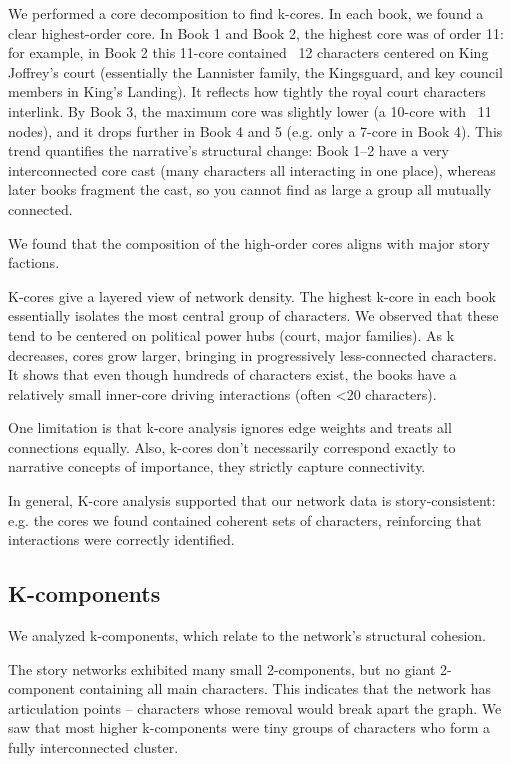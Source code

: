 \documentclass[12pt, a4paper]{article}
\begin{document}
We performed a core decomposition to find k-cores. In each book, we found a clear highest-order core. In Book 1 and Book 2, the highest core was of order 11: for example, in Book 2 this 11-core contained ~12 characters centered on King Joffrey's court (essentially the Lannister family, the Kingsguard, and key council members in King's Landing). It reflects how tightly the royal court characters interlink. By Book 3, the maximum core was slightly lower (a 10-core with ~11 nodes), and it drops further in Book 4 and 5 (e.g. only a 7-core in Book 4). This trend quantifies the narrative's structural change: Book 1–2 have a very interconnected core cast (many characters all interacting in one place), whereas later books fragment the cast, so you cannot find as large a group all mutually connected. 

We found that the composition of the high-order cores aligns with major story factions.

K-cores give a layered view of network density. The highest k-core in each book essentially isolates the most central group of characters. We observed that these tend to be centered on political power hubs (court, major families). As k decreases, cores grow larger, bringing in progressively less-connected characters. It shows that even though hundreds of characters exist, the books have a relatively small inner-core driving interactions (often <20 characters).

One limitation is that k-core analysis ignores edge weights and treats all connections equally. Also, k-cores don't necessarily correspond exactly to narrative concepts of importance, they strictly capture connectivity. 

In general, K-core analysis supported that our network data is story-consistent: e.g. the cores we found contained coherent sets of characters, reinforcing that interactions were correctly identified.


\subsection*{K-components}

We analyzed k-components, which relate to the network's structural cohesion.

The story networks exhibited many small 2-components, but no giant 2-component containing all main characters. This indicates that the network has articulation points – characters whose removal would break apart the graph. 
We saw that most higher k-components were tiny groups of characters who form a fully interconnected cluster. 
\end{document}

